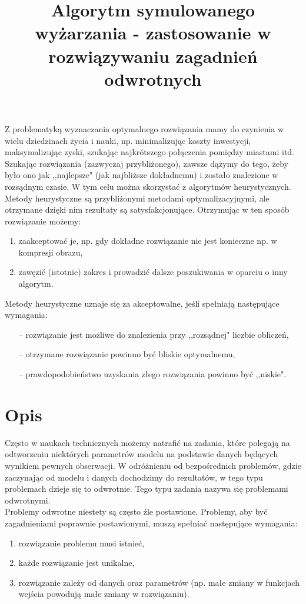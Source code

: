 \documentclass[twoside]{projektInzynierskiMS1}
\title{Algorytm symulowanego wyżarzania - zastosowanie w rozwiązywaniu zagadnień odwrotnych}
\newcommand{\si}{ś}
\begin{document}
Z problematyką wyznaczania optymalnego rozwiązania mamy do czynienia w wielu dziedzinach życia i nauki, np. minimalizując koszty inwestycji, maksymalizując zyski, szukając najkrótszego połączenia pomiędzy miastami itd. Szukając rozwiązania (zazwyczaj przybliżonego), zawsze dążymy do tego, żeby było ono jak ,,najlepsze" (jak najbliższe dokładnemu) i zostało znalezione w rozsądnym czasie. W tym celu można skorzystać z algorytmów heurystycznych. \\ 


Metody heurystyczne są przybliżonymi metodami optymalizacyjnymi, ale otrzymane dzięki nim rezultaty są satysfakcjonujące. Otrzymując w ten sposób rozwiązanie możemy:

\begin{enumerate}
	\item zaakceptować je, np. gdy dokładne rozwiązanie nie jest konieczne np. w kompresji obrazu,
	\item zawęzić (istotnie) zakres i prowadzić dalsze poszukiwania w oparciu o inny algorytm. \\
\end{enumerate}
Metody heurystyczne uznaje się za akceptowalne, jeśli spełniają następujące wymagania:
\begin{itemize}
	\item[--] rozwiązanie jest możliwe do znalezienia przy ,,rozsądnej" liczbie obliczeń,
	\item[--] otrzymane rozwiązanie powinno być bliskie optymalnemu,
	\item[--] prawdopodobieństwo uzyskania złego rozwiązania powinno być ,,niskie".
\end{itemize}

\section{Opis}
Często w naukach technicznych możemy natrafić na zadania, które polegają na odtworzeniu niektórych parametrów modelu na podstawie danych będących wynikiem pewnych obserwacji. W odróżnieniu od bezpo\si rednich problemów, gdzie zaczynając od modelu i danych dochodzimy do rezultatów, w tego typu problemach dzieje się to odwrotnie. Tego typu zadania nazywa się problemami odwrotnymi. \\

Problemy odwrotne niestety są często źle postawione. Problemy, aby być zagadnieniami poprawnie postawionymi, muszą spełniać następujące wymagania:
\begin{enumerate}
	\item rozwiązanie problemu musi istnieć,
	\item każde rozwiązanie jest unikalne,
	\item rozwiązanie zależy od danych oraz parametrów (np. małe zmiany w funkcjach wej\si cia powodują małe zmiany w rozwiązaniu). \\
\end{enumerate}
\end{document}
